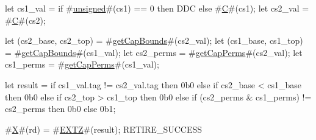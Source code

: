 let cs1_val = if #\hyperref[sailRISCVzunsigned]{unsigned}#(cs1) == 0 then DDC else #\hyperref[sailRISCVzC]{C}#(cs1);
let cs2_val = #\hyperref[sailRISCVzC]{C}#(cs2);

let (cs2_base, cs2_top) = #\hyperref[sailRISCVzgetCapBounds]{getCapBounds}#(cs2_val);
let (cs1_base, cs1_top) = #\hyperref[sailRISCVzgetCapBounds]{getCapBounds}#(cs1_val);
let cs2_perms = #\hyperref[sailRISCVzgetCapPerms]{getCapPerms}#(cs2_val);
let cs1_perms = #\hyperref[sailRISCVzgetCapPerms]{getCapPerms}#(cs1_val);

let result = if cs1_val.tag != cs2_val.tag then
               0b0
             else if cs2_base < cs1_base then
               0b0
             else if cs2_top > cs1_top then
               0b0
             else if (cs2_perms & cs1_perms) != cs2_perms then
               0b0
             else
               0b1;

#\hyperref[sailRISCVzX]{X}#(rd) = #\hyperref[sailRISCVzEXTZ]{EXTZ}#(result);
RETIRE_SUCCESS
